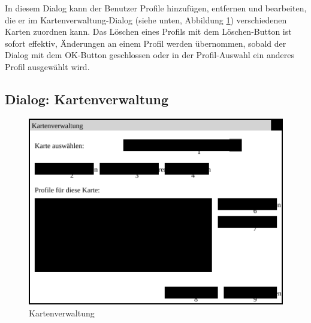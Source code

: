 \documentclass[a4paper, 11pt]{article}
\begin{document}
In diesem Dialog kann der Benutzer Profile hinzufügen, entfernen und bearbeiten, die er im Kartenverwaltung-Dialog (siehe unten, Abbildung \ref{fig:mockupkartenverwaltung}) verschiedenen Karten zuordnen kann. Das Löschen eines Profils mit dem Löschen-Button ist sofort effektiv, Änderungen an einem Profil werden übernommen, sobald der Dialog mit dem OK-Button geschlossen oder in der Profil-Auswahl ein anderes Profil ausgewählt wird.

\subsection{Dialog: Kartenverwaltung}
\begin{figure}[H]
\centering
\includegraphics[width=0.7\linewidth]{Kartenverwaltung}
\caption{Kartenverwaltung}
\label{fig:mockupkartenverwaltung}
\end{figure}
\end{document}
